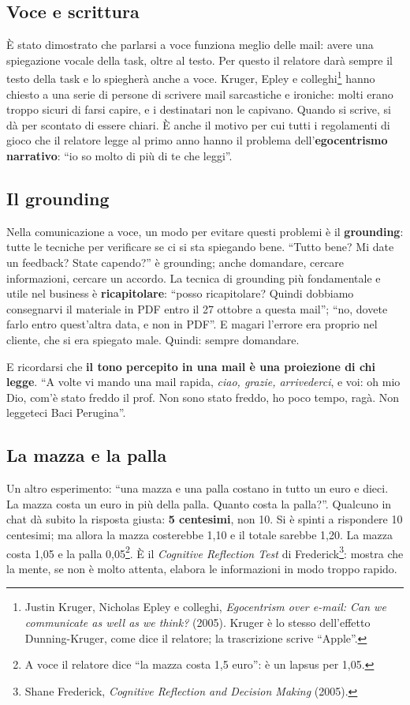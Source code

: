 \subsection{Voce e scrittura}

È stato dimostrato che parlarsi a voce funziona meglio delle mail: avere una
spiegazione vocale della task, oltre al testo. Per questo il relatore darà
sempre il testo della task e lo spiegherà anche a voce. Kruger, Epley e
colleghi\footnote{Justin Kruger, Nicholas Epley e colleghi, \emph{Egocentrism
over e-mail: Can we communicate as well as we think?} (2005). Kruger è lo
stesso dell'effetto Dunning-Kruger, come dice il relatore; la trascrizione
scrive ``Apple''.} hanno chiesto a una serie di persone di scrivere mail
sarcastiche e ironiche: molti erano troppo sicuri di farsi capire, e i
destinatari non le capivano. Quando si scrive, si dà per scontato di essere
chiari. È anche il motivo per cui tutti i regolamenti di gioco che il relatore
legge al primo anno hanno il problema dell'\textbf{egocentrismo narrativo}:
``io so molto di più di te che leggi''.

\subsection{Il grounding}

Nella comunicazione a voce, un modo per evitare questi problemi è il
\textbf{grounding}: tutte le tecniche per verificare se ci si sta spiegando
bene. ``Tutto bene? Mi date un feedback? State capendo?'' è grounding; anche
domandare, cercare informazioni, cercare un accordo. La tecnica di grounding
più fondamentale e utile nel business è \textbf{ricapitolare}: ``posso
ricapitolare? Quindi dobbiamo consegnarvi il materiale in PDF entro il 27
ottobre a questa mail''; ``no, dovete farlo entro quest'altra data, e non in
PDF''. E magari l'errore era proprio nel cliente, che si era spiegato male.
Quindi: sempre domandare.

E ricordarsi che \textbf{il tono percepito in una mail è una proiezione di chi
legge}. ``A volte vi mando una mail rapida, \emph{ciao, grazie, arrivederci}, e
voi: oh mio Dio, com'è stato freddo il prof. Non sono stato freddo, ho poco
tempo, ragà. Non leggeteci Baci Perugina''.

\subsection{La mazza e la palla}

Un altro esperimento: ``una mazza e una palla costano in tutto un euro e dieci.
La mazza costa un euro in più della palla. Quanto costa la palla?''. Qualcuno
in chat dà subito la risposta giusta: \textbf{5 centesimi}, non 10. Si è spinti
a rispondere 10 centesimi; ma allora la mazza costerebbe 1,10 e il totale
sarebbe 1,20. La mazza costa 1,05 e la palla 0,05\footnote{A voce il relatore
dice ``la mazza costa 1,5 euro'': è un lapsus per 1,05.}. È il \emph{Cognitive
Reflection Test} di Frederick\footnote{Shane Frederick, \emph{Cognitive
Reflection and Decision Making} (2005).}: mostra che la mente, se non è molto
attenta, elabora le informazioni in modo troppo rapido.

